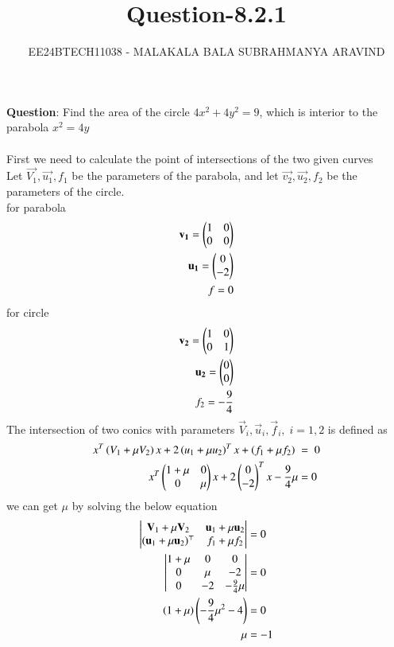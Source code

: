 \documentclass[journal]{IEEEtran}
\numberwithin{equation}{enumi}
\numberwithin{figure}{enumi}
\begin{document}

\title{Question-8.2.1}
\author{EE24BTECH11038 - MALAKALA BALA SUBRAHMANYA ARAVIND}
{\let\newpage\relax\maketitle}
\textbf{Question}:
Find the area of the circle $4x^2+4y^2=9$, which is interior to the parabola $x^2=4y$\\
\solution \\


First we need to calculate the point of intersections of the two given curves\\
Let $\vec{V_1},\vec{u_1},f_1$ be the parameters of the parabola, and let $\vec{v_2},\vec{u_2},f_2$ be the parameters of the circle.\\
for parabola 
\begin{align}
    \mathbf{v_1}=\begin{pmatrix}1 &0 \\ 0 & 0\end{pmatrix}\\
    \mathbf{u_1}=\begin{pmatrix}0\\-2\end{pmatrix}\\
    f=0
\end{align}
for circle
\begin{align}
    \mathbf{v_2}=\begin{pmatrix}1 &0 \\ 0& 1\end{pmatrix}\\
    \mathbf{u_2}=\begin{pmatrix}0\\0\end{pmatrix}\\
    f_2=-\frac{9}{4}
\end{align}
The intersection of two conics with parameters $\vec{V}_i,\vec{u}_i,\vec{f}_i,\;i= 1,2$ is defined as
\begin{align}
x^T\left(V_1+\mu V_2\right)x+2\left(u_1+\mu u_2\right)^T x + \left(f_1+\mu f_2\right)\;&=\;0\\
x^T\begin{pmatrix}1+\mu & 0 \\ 0 & \mu\end{pmatrix}x+2\begin{pmatrix}0\\-2\end{pmatrix}^Tx-\frac{9}{4}\mu &=0
\end{align}
we can get $\mu$ by solving the below equation
\begin{align}
    \begin{vmatrix}\mathbf{V}_1 + \mu\mathbf{V}_2 & \mathbf{u}_1 + \mu\mathbf{u}_2 \\ (\mathbf{u}_1+ \mu\mathbf{u}_2)^\top & f_1 + \mu f_2\end{vmatrix} &= 0 \\
    \begin{vmatrix}1+\mu & 0 & 0 \\0 & \mu & -2\\0 & -2 & -\frac{9}{4}\mu\end{vmatrix}&=0\\
    \left(1+\mu\right)\left(-\frac{9}{4}\mu^2-4\right)&=0\\
    \mu&=-1
\end{align}
\end{document}
